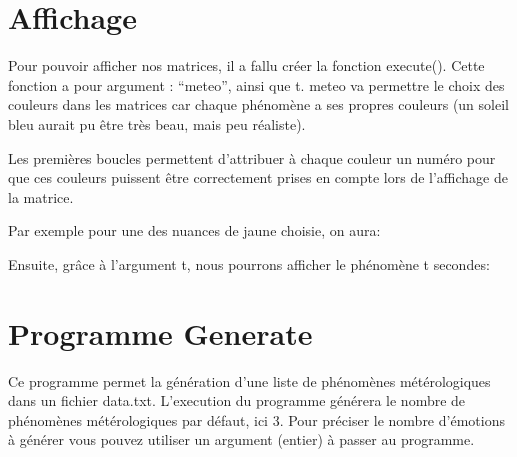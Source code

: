 \documentclass[letterpaper,10pt,english]{sphinxmanual}
\begin{document}
\sphinxstepscope


\section{Affichage}
\label{\detokenize{test_matrix:affichage}}\label{\detokenize{test_matrix::doc}}
\sphinxAtStartPar
Pour pouvoir afficher nos matrices, il a fallu créer la fonction execute().
Cette fonction a pour argument : “meteo”, ainsi que t.
meteo va permettre le choix des couleurs dans les matrices car chaque phénomène a ses propres couleurs (un soleil bleu aurait pu être très beau, mais
peu réaliste).

\sphinxAtStartPar
{}

\sphinxAtStartPar
Les premières boucles permettent d’attribuer à chaque couleur un numéro pour que ces couleurs puissent être correctement prises en compte lors de l’affichage de la matrice.

\sphinxAtStartPar
Par exemple pour une des nuances de jaune choisie, on aura:

\begin{sphinxVerbatim}[commandchars=\\\{\}]
   
       
          \PYG{p}{[}\PYG{p}{]}\PYG{p}{[}\PYG{p}{]}  
            
\end{sphinxVerbatim}

\sphinxAtStartPar
Ensuite, grâce à l’argument t, nous pourrons afficher le phénomène t secondes:

\begin{sphinxVerbatim}[commandchars=\\\{\}]
\end{sphinxVerbatim}

\sphinxstepscope


\section{Programme Generate}
\label{\detokenize{generate:programme-generate}}\label{\detokenize{generate::doc}}
\sphinxAtStartPar
Ce programme permet la génération d’une liste de phénomènes métérologiques dans un fichier data.txt.
L’execution du programme générera le nombre de phénomènes métérologiques par défaut, ici 3. Pour préciser
le nombre d’émotions à générer vous pouvez utiliser un argument (entier) à passer au programme.
\end{document}

